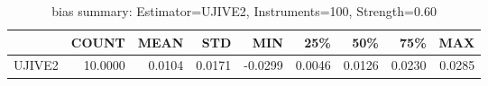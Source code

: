\begin{table}[ht]
\centering
\caption{bias summary: Estimator=UJIVE2, Instruments=100, Strength=0.60}
\begin{tabular}{lrrrrrrrr}
\toprule
 & COUNT & MEAN & STD & MIN & 25\% & 50\% & 75\% & MAX \\
\midrule
UJIVE2 & 10.0000 & 0.0104 & 0.0171 & -0.0299 & 0.0046 & 0.0126 & 0.0230 & 0.0285 \\
\bottomrule
\end{tabular}
\end{table}
